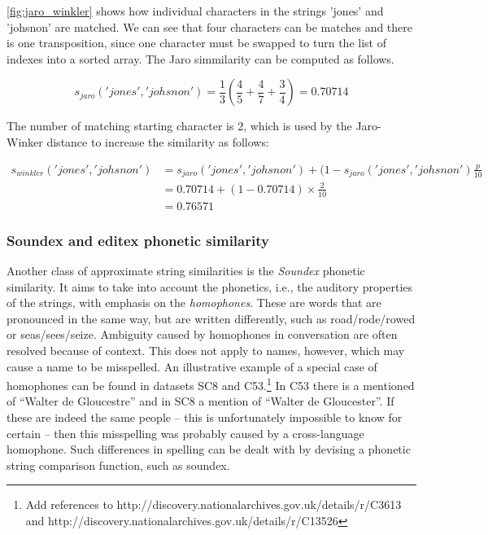 \cref{fig:jaro_winkler} shows how individual characters in the strings 'jones' and 'johsnon' are matched.
We can see that four characters can be matches and there is one transposition, since one character must be swapped to turn the list of indexes into a sorted array.
The Jaro simmilarity can be computed as follows.

\begin{equation*}
    s_{jaro}('jones', 'johsnon') = \frac{1}{3} \left(\frac{4}{5} + \frac{4}{7} + \frac{3}{4} \right) = 0.70714
\end{equation*}

\noindent The number of matching starting character is $2$, which is used by the Jaro-Winker distance to increase the similarity as follows:

\begin{align*}
    s_{winkler}('jones', 'johsnon') &= s_{jaro}('jones', 'johsnon') + (1-s_{jaro}('jones', 'johsnon')\frac{p}{10} \\
    &= 0.70714 + (1 - 0.70714)\times\frac{2}{10} \\
    &= 0.76571
\end{align*}




\subsubsection{Soundex and editex phonetic similarity}
\label{sec:soundex}

Another class of approximate string similarities is the \emph{Soundex} phonetic similarity.
It aims to take into account the phonetics, i.e., the auditory properties of the strings, with emphasis on the \emph{homophones}.
These are words that are pronounced in the same way, but are written differently, such as road/rode/rowed or seas/sees/seize.
Ambiguity caused by homophones in conversation are often resolved because of context.
This does not apply to names, however, which may cause a name to be misspelled.
An illustrative example of a special case of homophones can be found in datasets SC8 and C53.\footnote{Add references to http://discovery.nationalarchives.gov.uk/details/r/C3613 and http://discovery.nationalarchives.gov.uk/details/r/C13526}
In C53 there is a mentioned of ``Walter de Gloucestre'' and in SC8 a mention of ``Walter de Gloucester''.
If these are indeed the same people -- this is unfortunately impossible to know for certain -- then this misspelling was probably caused by a cross-language homophone.
Such differences in spelling can be dealt with by devising a phonetic string comparison function, such as soundex.

